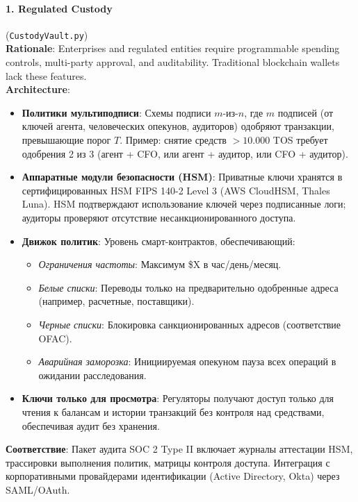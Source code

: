\documentclass[11pt]{article}
\begin{document}
\paragraph{1. Regulated Custody} (\texttt{CustodyVault.py})\\
\textbf{Rationale}: Enterprises and regulated entities require programmable spending controls, multi-party approval, and auditability. Traditional blockchain wallets lack these features.\\
\textbf{Architecture}:
\begin{itemize}[noitemsep]
  \item \textbf{Политики мультиподписи}: Схемы подписи $m$-из-$n$, где $m$ подписей (от ключей агента, человеческих опекунов, аудиторов) одобряют транзакции, превышающие порог $T$. Пример: снятие средств $>10{.}000$ TOS требует одобрения 2 из 3 (агент + CFO, или агент + аудитор, или CFO + аудитор).
  \item \textbf{Аппаратные модули безопасности (HSM)}: Приватные ключи хранятся в сертифицированных HSM FIPS 140-2 Level 3 (AWS CloudHSM, Thales Luna). HSM подтверждают использование ключей через подписанные логи; аудиторы проверяют отсутствие несанкционированного доступа.
  \item \textbf{Движок политик}: Уровень смарт-контрактов, обеспечивающий:
    \begin{itemize}[noitemsep]
      \item \emph{Ограничения частоты}: Максимум \$X в час/день/месяц.
      \item \emph{Белые списки}: Переводы только на предварительно одобренные адреса (например, расчетные, поставщики).
      \item \emph{Черные списки}: Блокировка санкционированных адресов (соответствие OFAC).
      \item \emph{Аварийная заморозка}: Инициируемая опекуном пауза всех операций в ожидании расследования.
    \end{itemize}
  \item \textbf{Ключи только для просмотра}: Регуляторы получают доступ только для чтения к балансам и истории транзакций без контроля над средствами, обеспечивая аудит без хранения.
\end{itemize}
\textbf{Соответствие}: Пакет аудита SOC 2 Type II включает журналы аттестации HSM, трассировки выполнения политик, матрицы контроля доступа. Интеграция с корпоративными провайдерами идентификации (Active Directory, Okta) через SAML/OAuth.
\end{document}
